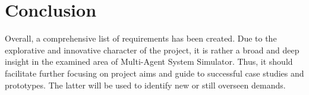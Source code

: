 \chapter{Conclusion}\label{conclusion}

Overall, a comprehensive list of requirements has been created. Due to the explorative and innovative character of the project, it is rather a broad and deep insight in the examined area of Multi-Agent System Simulator. Thus, it should facilitate further focusing on project aims and guide to successful case studies and prototypes. The latter will be used to identify new or still overseen demands.
